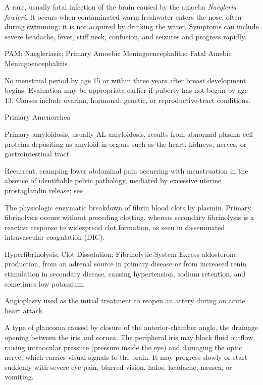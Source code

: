  A rare, usually fatal infection of the brain caused by the amoeba \textit{Naegleria fowleri}. It occurs when contaminated warm freshwater enters the nose, often during swimming; it is not acquired by drinking the water. Symptoms can include severe headache, fever, stiff neck, confusion, and seizures and progress rapidly.

\synonyms
PAM; Naegleriasis; Primary Amoebic Meningoencephalitis; Fatal Amebic Meningoencephalitis

 No menstrual period by age 15 or within three years after breast development begins. Evaluation may be appropriate earlier if puberty has not begun by age 13. Causes include ovarian, hormonal, genetic, or reproductive-tract conditions.

\synonyms
Primary Amenorrhea

 Primary amyloidosis, usually AL amyloidosis, results from abnormal plasma-cell proteins depositing as amyloid in organs such as the heart, kidneys, nerves, or gastrointestinal tract.

 Recurrent, cramping lower abdominal pain occurring with menstruation in the absence of identifiable pelvic pathology, mediated by excessive uterine prostaglandin release; see .

 The physiologic enzymatic breakdown of fibrin blood clots by plasmin. Primary fibrinolysis occurs without preceding clotting, whereas secondary fibrinolysis is a reactive response to widespread clot formation, as seen in disseminated intravascular coagulation (DIC).

\synonyms
Hyperfibrinolysis; Clot Dissolution; Fibrinolytic System
 Excess aldosterone production, from an adrenal source in primary disease or from increased renin stimulation in secondary disease, causing hypertension, sodium retention, and sometimes low potassium.

 Angioplasty used as the initial treatment to reopen an artery during an acute heart attack.

 A type of glaucoma caused by closure of the anterior-chamber angle, the drainage opening between the iris and cornea. The peripheral iris may block fluid outflow, raising intraocular pressure (pressure inside the eye) and damaging the optic nerve, which carries visual signals to the brain. It may progress slowly or start suddenly with severe eye pain, blurred vision, halos, headache, nausea, or vomiting.

